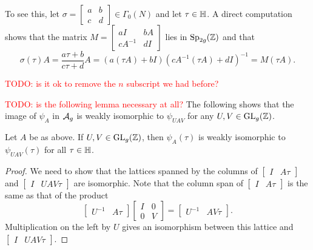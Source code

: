 \documentclass{amsart}
\begin{document}
To see this, let $\sigma = \begin{bmatrix} a & b \\ c & d \end{bmatrix} \in \Gamma_0(N)$ and let $\tau \in \mathbb{H}$. A direct computation shows that the matrix $M = \begin{bmatrix} aI & bA \\ cA^{-1} & dI \end{bmatrix}$ lies in $\operatorname{Sp}_{2g}(\mathbb{Z})$
and that
\[
  \sigma(\tau)A
  =
  \frac{a\tau + b}{c\tau + d} A
  =
  \left(a(\tau A) + bI\right)\left(cA^{-1}(\tau A) + dI\right)^{-1}
  =
  M(\tau A).
\]

\textcolor{red}{TODO: is it ok to remove the $n$ subscript we had before?}

\textcolor{red}{TODO: is the following lemma necessary at all?}
The following shows that the image of $\psi_A$ in $\mathcal{A}_g$ is weakly isomorphic to $\psi_{UAV}$ for any $U,V \in \operatorname{GL}_g(\mathbb{Z})$.

\begin{lemma}\label{lem:A-UAV-weakly-isom}
  Let $A$ be as above. If $U,V \in \operatorname{GL}_g(\mathbb{Z})$, then $\psi_{A}(\tau)$ is weakly isomorphic to $\psi_{UAV}(\tau)$ for all $\tau \in \mathbb{H}$.
\end{lemma}
\begin{proof}
  We need to show that the lattices spanned by the columns of $\begin{bmatrix} I & A\tau \end{bmatrix}$ and $\begin{bmatrix} I & UAV\tau \end{bmatrix}$ are isomorphic. Note that the column span of $\begin{bmatrix} I & A\tau \end{bmatrix}$ is the same as that of the product
  \[
    \begin{bmatrix} U^{-1} & A\tau \end{bmatrix}\begin{bmatrix} I & 0 \\ 0 & V \end{bmatrix}
    =
    \begin{bmatrix} U^{-1} & AV\tau \end{bmatrix}.
  \]
  Multiplication on the left by $U$ gives an isomorphism between this lattice and $\begin{bmatrix} I & UAV\tau \end{bmatrix}$.
\end{proof}
\end{document}
